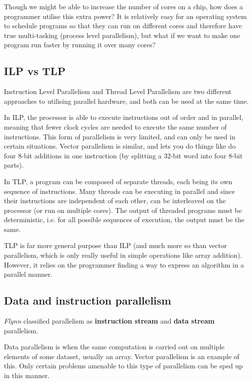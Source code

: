 Though we might be able to increase the number of cores on a chip, how does a
programmer utilise this extra power? It is relatively easy for an operating
system to schedule programs so that they can run on different cores and
therefore have true multi-tasking (process level parallelism), but what if we
want to make one program run faster by running it over many cores?

\subsection{ILP vs TLP}

Instruction Level Parallelism and Thread Level Parallelism are two different
approaches to utilising parallel hardware, and both can be used at the same
time.

In ILP, the processor is able to execute instructions out of order and in
parallel, meaning that fewer clock cycles are needed to execute the same number
of instructions. This form of parallelism is very limited, and can only be used
in certain situations. Vector parallelism is similar, and lets you do things
like do four 8-bit additions in one instruction (by splitting a 32-bit word into
four 8-bit parts).

In TLP, a program can be composed of separate threads, each
being its own sequence of instructions. Many threads can be executing in
parallel and since their instructions are independent of each other, can be
interleaved on the processor (or run on multiple cores). The output of threaded
programs must be deterministic, i.e. for all possible sequences of execution,
the output must be the same.

TLP is far more general purpose than ILP (and much more so than vector
parallelism, which is only really useful in simple operations like array
addition). However, it relies on the programmer finding a way to express an
algorithm in a parallel manner.

\subsection{Data and instruction parallelism}

\textit{Flynn} classified parallelism as \textbf{instruction stream} and
\textbf{data stream} parallelism.

Data parallelism is when the same computation is carried out on multiple
elements of some dataset, usually an array. Vector parallelism is an example of
this. Only certain problems amenable to this type of parallelism can be sped up
in this manner.

